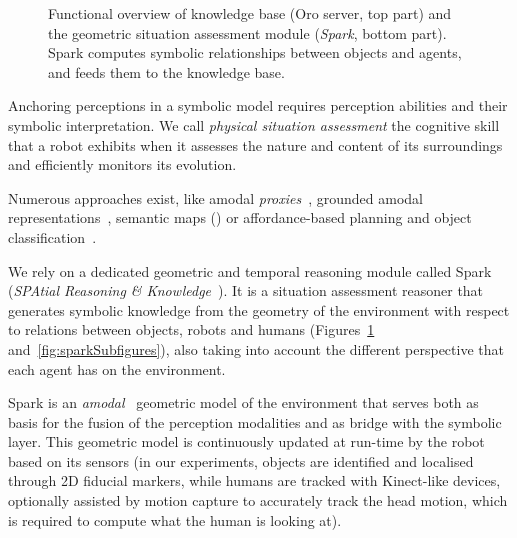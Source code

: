 \documentclass[preprint,3p,times]{elsarticle}
\begin{document}
\begin{figure}
{
}
    \caption{Functional overview of knowledge base ({\sc Oro} server, top part)
    and the geometric situation assessment module (\emph{{\sc Spark}}, bottom
    part). {\sc Spark} computes symbolic relationships between objects and
    agents, and feeds them to the knowledge base.}

        \label{fig|spark-oro}
\end{figure}

Anchoring perceptions in a symbolic model requires perception abilities and
their symbolic interpretation. We call \emph{physical situation assessment} the
cognitive skill that a robot exhibits when it assesses the nature and content of its
surroundings and efficiently monitors its evolution.

Numerous approaches exist, like amodal \emph{proxies}~\cite{Jacobsson2008},
grounded amodal representations~\cite{Mavridis2006}, semantic maps
(\cite{Nuechter2008, Galindo2008,Blodow2011}) or affordance-based planning and
object classification~\cite{Lorken2008, Varadarajan2011}.



We rely on a dedicated geometric and temporal reasoning module called {\sc
Spark} (\emph{SPAtial Reasoning \& Knowledge}~\cite{Sisbot2011}). It is a
situation assessment reasoner that generates symbolic knowledge from the
geometry of the environment with respect to relations between objects,
robots and humans (Figures~\ref{fig|spark-oro}
and~\ref{fig:sparkSubfigures}), also taking into account the different
perspective that each agent has on the environment.

{\sc Spark} is an \emph{amodal}~\cite{Mavridis2006} geometric model of the
environment that serves both as basis for the fusion of the perception
modalities and as bridge with the symbolic layer. This geometric model is
continuously updated at run-time by the robot based on its sensors (in our
experiments, objects are identified and localised through 2D fiducial markers, while
humans are tracked with Kinect-like devices, optionally assisted by motion
capture to accurately track the head motion, which is required to compute what
the human is looking at).
\end{document}
